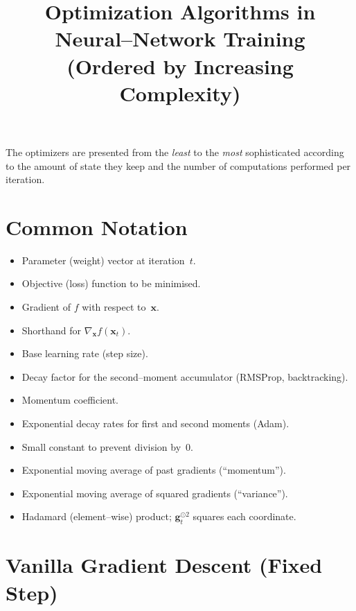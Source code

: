 \documentclass[12pt]{article}
\title{Optimization Algorithms in Neural--Network Training\\(Ordered by Increasing Complexity)}
\author{}
\date{}
\begin{document}
\maketitle

The optimizers are presented from the \emph{least} to the \emph{most}
sophisticated according to the amount of state they keep and the number of
computations performed per iteration.

\section*{Common Notation}
\begin{itemize}
  \item[$\bm x_t$] Parameter (weight) vector at iteration~$t$.
  \item[$f(\bm x)$] Objective (loss) function to be minimised.
  \item[$\nabla_{\!\bm x}f(\bm x)$] Gradient of $f$ with respect to~$\bm x$.
  \item[$\bm g_t$] Shorthand for $\nabla_{\!\bm x}f(\bm x_t)$.
  \item[$\alpha,\eta$] Base learning rate (step size).
  \item[$\gamma$] Decay factor for the second--moment accumulator (RMSProp, backtracking).
  \item[$\beta$] Momentum coefficient.
  \item[$\beta_1,\beta_2$] Exponential decay rates for first and second moments (Adam).
  \item[$\varepsilon$] Small constant to prevent division by~$0$.
  \item[$\bm v_t$] Exponential moving average of past gradients (``momentum'').
  \item[$\bm s_t$] Exponential moving average of squared gradients (``variance'').
  \item[$\odot$] Hadamard (element--wise) product; $\bm g_t^{\odot 2}$ squares each coordinate.
\end{itemize}

\section{Vanilla Gradient Descent (Fixed Step)}
\end{document}
